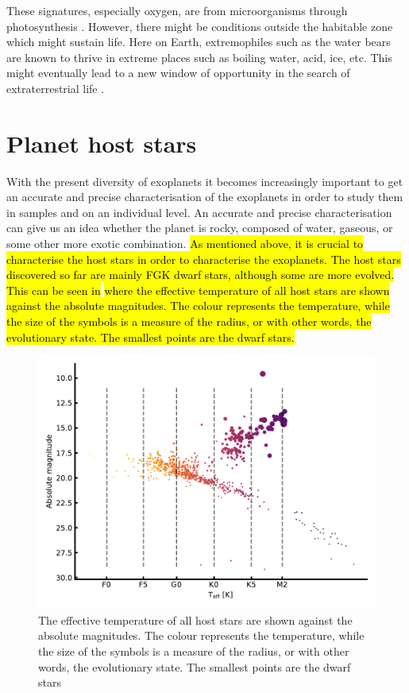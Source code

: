 These signatures, especially oxygen, are from microorganisms through photosynthesis
\citep[see e.g.][]{Kasting2002}. However, there might be conditions outside the habitable zone which
might sustain life. Here on Earth, extremophiles such as the water bears are known to thrive in
extreme places such as boiling water, acid, ice, etc. This might eventually lead to a new window of
opportunity in the search of extraterrestrial life \citep{Cavicchioli2002}.



\section{Planet host stars}
\label{sec:planet_host_stars}

With the present diversity of exoplanets it becomes increasingly important to get an accurate and
precise characterisation of the exoplanets in order to study them in samples and on an individual
level. An accurate and precise characterisation can give us an idea whether the planet is rocky,
composed of water, gaseous, or some other more exotic combination. \hl{As mentioned above, it is
crucial to characterise the host stars in order to characterise the exoplanets. The host stars
discovered so far are mainly FGK dwarf stars, although some are more evolved. This can be seen in}
 \hl{where the effective temperature of all host stars are shown against
the absolute magnitudes. The colour represents the temperature, while the size of the symbols is a
measure of the radius, or with other words, the evolutionary state. The smallest points are the
dwarf stars.}

\begin{figure}[htpb!]
    \centering
    \includegraphics[width=1.0\linewidth]{figures/hostDistribution.pdf}
    \caption{The effective temperature of all host stars are shown against the absolute magnitudes.
             The colour represents the temperature, while the size of the symbols is a measure of
             the radius, or with other words, the evolutionary state. The smallest points are the
             dwarf stars}
    \label{fig:hostDistribution}
\end{figure}

